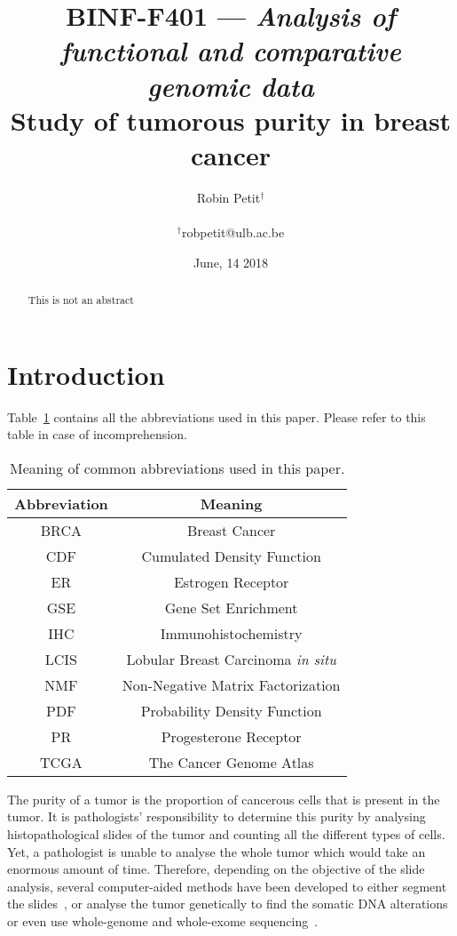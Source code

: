 \documentclass[letterpaper]{article}
\title{BINF-F401 --- \textit{Analysis of functional and comparative genomic data}\\
Study of tumorous purity in breast cancer}
\author{Robin Petit$^\dagger$\\
\mbox{}\\
$^\dagger$robpetit@ulb.ac.be}
\date{June, 14 2018}
\begin{document}
\maketitle

\begin{abstract}
	This is not an abstract
\end{abstract}

\section{Introduction}
Table~\ref{tab:abbrev} contains all the abbreviations used in this paper. Please refer to this table in case of incomprehension.

\begin{table}[!h]
\centering
\begin{tabular}{|c|c|}
\hline
Abbreviation & Meaning \\ \hline \hline
BRCA & Breast Cancer \\ \hline
CDF & Cumulated Density Function \\ \hline
ER & Estrogen Receptor \\ \hline
GSE & Gene Set Enrichment \\ \hline
IHC & Immunohistochemistry \\ \hline
LCIS & Lobular Breast Carcinoma \textit{in situ} \\ \hline
NMF & Non-Negative Matrix Factorization \\ \hline
PDF & Probability Density Function \\ \hline
PR & Progesterone Receptor \\ \hline
TCGA & The Cancer Genome Atlas \\ \hline
\end{tabular}
\caption{Meaning of common abbreviations used in this paper.\label{tab:abbrev}}
\end{table}

The purity of a tumor is the proportion of cancerous cells that is present in the tumor. It is pathologists' responsibility to determine this purity
by analysing histopathological slides of the tumor and counting all the different types of cells. Yet, a pathologist is unable to analyse the whole
tumor which would take an enormous amount of time. Therefore, depending on the objective of the slide analysis, several computer-aided methods have
been developed to either segment the slides~\citep{sirinukunwattana2016locality,xing2016robust,komura2017machine}, or analyse the tumor genetically
to find the somatic DNA alterations~\citep{carter2012absolute} or even use whole-genome and whole-exome sequencing~\citep{oesper2014quantifying}.
\end{document}
